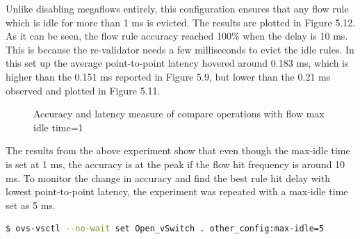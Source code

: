 Unlike disabling megaflows entirely, this configuration ensures that any flow rule which is idle for more than 1 ms is evicted. The results are plotted in Figure 5.12. As it can be seen, the flow rule accuracy reached 100\% when the delay is 10 ms. This is because the re-validator needs a few milliseconds to evict the idle rules. In this set up the average point-to-point latency hovered around 0.183 ms, which is higher than the 0.151 ms reported in Figure 5.9, but lower than the 0.21 ms observed and plotted in Figure 5.11.


\begin{figure}[H]		
	
	\caption{Accuracy and latency measure of compare operations with flow max idle time=1}
	\hfil{}
\end{figure}

 The results from the above experiment show that even though the max-idle time is set at 1 ms, the accuracy is at the peak if the flow hit frequency is around 10 ms. To monitor the change in accuracy and find the best rule hit delay with lowest point-to-point latency, the experiment was repeated with a max-idle time set as 5 ms.

	\begin{lstlisting}[language=bash]
$ ovs-vsctl --no-wait set Open_vSwitch . other_config:max-idle=5 \end{lstlisting}

